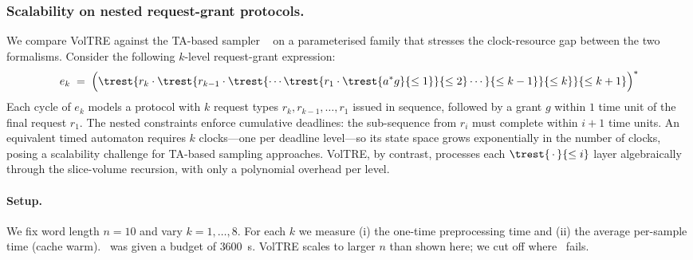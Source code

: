 %

\subsubsection{Scalability on nested request-grant protocols.}

We compare VolTRE against the TA-based sampler \wordgen\ \cite{wordgen} on a
parameterised family that stresses the clock-resource gap between the two
formalisms.
Consider the following $k$-level request-grant expression:
\begin{equation}\label{eq:ek}
  e_k \;=\;
  \Bigl(
    \trest{r_k \cdot
      \trest{r_{k-1} \cdot
        \trest{\cdots
          \trest{r_1 \cdot \trest{a^*g}{\leq 1}}{\leq 2}
        \cdots}{\leq k-1}
      }{\leq k}
    }{\leq k+1}
  \Bigr)^*
\end{equation}
Each cycle of $e_k$ models a protocol with $k$ request types
$r_k, r_{k-1}, \ldots, r_1$ issued in sequence,
followed by a grant $g$ within $1$ time unit of the final request $r_1$.
The nested constraints enforce cumulative deadlines: the sub-sequence
from $r_i$ must complete within $i+1$ time units.
An equivalent timed automaton requires $k$ clocks---one per deadline
level---so its state space grows exponentially in the number of clocks,
posing a scalability challenge for TA-based sampling approaches.
VolTRE, by contrast, processes each $\trest{\,\cdot\,}{\leq i}$ layer
algebraically through the slice-volume recursion, with only a
polynomial overhead per level.

\paragraph{Setup.}
We fix word length $n=10$ and vary $k=1,\ldots,8$.
For each $k$ we measure (i) the one-time preprocessing time
and (ii) the average per-sample time (cache warm).
\wordgen\ was given a budget of $3600$~s.
VolTRE scales to larger $n$ than shown here; we cut off where \wordgen\ fails.

